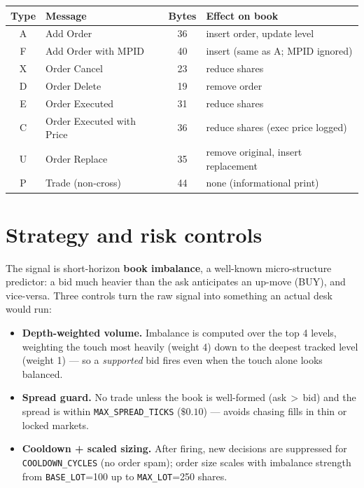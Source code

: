 \documentclass[10pt,a4paper]{article}
\begin{document}
\begin{center}
\renewcommand{\arraystretch}{1.12}
\begin{tabular}{@{}c l c l@{}}
\toprule
\textbf{Type} & \textbf{Message} & \textbf{Bytes} & \textbf{Effect on book} \\
\midrule
A & Add Order                 & 36 & insert order, update level \\
F & Add Order with MPID       & 40 & insert (same as A; MPID ignored) \\
X & Order Cancel              & 23 & reduce shares \\
D & Order Delete              & 19 & remove order \\
E & Order Executed            & 31 & reduce shares \\
C & Order Executed with Price & 36 & reduce shares (exec price logged) \\
U & Order Replace             & 35 & remove original, insert replacement \\
P & Trade (non-cross)         & 44 & none (informational print) \\
\bottomrule
\end{tabular}
\end{center}

\section{Strategy and risk controls}

The signal is short-horizon \textbf{book imbalance}, a well-known micro-structure predictor:
a bid much heavier than the ask anticipates an up-move (BUY), and vice-versa. Three controls
turn the raw signal into something an actual desk would run:

\begin{itemize}[leftmargin=1.2em, itemsep=1pt, topsep=1pt]
  \item \textbf{Depth-weighted volume.} Imbalance is computed over the top 4 levels, weighting
        the touch most heavily (weight 4) down to the deepest tracked level (weight 1) --- so a
        \emph{supported} bid fires even when the touch alone looks balanced.
  \item \textbf{Spread guard.} No trade unless the book is well-formed (ask\,$>$\,bid) and the
        spread is within \texttt{MAX\_SPREAD\_TICKS} ($\$0.10$) --- avoids chasing fills in thin
        or locked markets.
  \item \textbf{Cooldown + scaled sizing.} After firing, new decisions are suppressed for
        \texttt{COOLDOWN\_CYCLES} (no order spam); order size scales with imbalance strength
        from \texttt{BASE\_LOT}=100 up to \texttt{MAX\_LOT}=250 shares.
\end{itemize}
\end{document}
